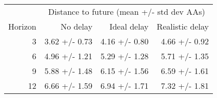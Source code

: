 
\begin{tabular*}{0.7\textwidth}{rrrr}
\toprule
          & \multicolumn{3}{c}{Distance to future (mean +/- std dev AAs)} \\
  Horizon & No delay & Ideal delay & Realistic delay \\
\midrule

3 & 3.62 +/- 0.73 & 4.16 +/- 0.80 & 4.66 +/- 0.92 \\
6 & 4.96 +/- 1.21 & 5.29 +/- 1.28 & 5.71 +/- 1.35 \\
9 & 5.88 +/- 1.48 & 6.15 +/- 1.56 & 6.59 +/- 1.61 \\
12 & 6.66 +/- 1.59 & 6.94 +/- 1.71 & 7.32 +/- 1.81 \\

\bottomrule
\end{tabular*}

